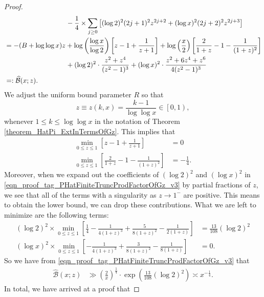 \documentclass[11pt,reqno,a4letter]{article}
\numberwithin{figure}{section}
\numberwithin{table}{section}
\theoremstyle{plain}
\numberwithin{theorem}{section}
\theoremstyle{definition}
\begin{document}
\begin{proof}
\begin{align}
\notag 
     & \phantom{= -(B + \log\log x) z\ } - 
     \frac{1}{4} \times \sum_{j \geq 0} \left[ 
     (\log 2)^2 (2j+1)^2 z^{2j+2} + (\log x)^2 (2j+2)^2 z^{2j+3} 
     \right] \\ 
\notag 
     & = -(B + \log\log x) z + 
     \log\left(\frac{\log x}{\log 2}\right) \left[ 
     z - 1 + \frac{1}{z+1}\right] + 
     \log\left(\frac{x}{2}\right)\left[ 
     \frac{2}{1+z} - 1 - \frac{1}{(1+z)^2}\right] \\ 
\notag 
     & \phantom{= -(B + \log\log x) z\ } + 
     (\log 2)^2 \cdot \frac{z^2+z^4}{(z^2-1)^3} + 
     (\log x)^2 \cdot \frac{z^2+6z^4+z^6}{4 (z^2-1)^3} \\ 
\label{eqn_proof_tag_PHatFiniteTruncProdFactorOfGz_v3} 
     & =: \widehat{\mathcal{B}}(x; z). 
\end{align} 
We adjust the uniform bound parameter $R$ so that 
$$z \equiv z(k, x) = \frac{k-1}{\log\log x} \in \left[0, 1\right),$$ 
whenever $1 \leq k \leq \log\log x$ 
in the notation of Theorem \ref{theorem_HatPi_ExtInTermsOfGz}. 
This implies that 
\begin{align*} 
\min_{0 \leq z \leq 1} \left[z - 1 + \frac{1}{z+1}\right] & = 0 \\ 
\min_{0 \leq z \leq 1} \left[\frac{2}{1+z} - 1 - \frac{1}{(1+z)^2}\right] & = -\frac{1}{4}. 
\end{align*} 
Moreover, when we expand out the coefficients of 
$(\log 2)^2$ and $(\log x)^2$ in 
\eqref{eqn_proof_tag_PHatFiniteTruncProdFactorOfGz_v3} 
by partial fractions of $z$, 
we see that all of the terms with a singularity as $z \rightarrow 1^{-}$ are positive. 
This means to obtain the lower bound, we can drop these contributions. 
What we are left to minimize are the following terms: 
\begin{align*} 
(\log 2)^2 \times \min_{0 \leq z \leq 1} \left[\frac{1}{4} - \frac{1}{4(1+z)^3} + 
     \frac{5}{8(1+z)^2} - \frac{1}{2(1+z)}\right] & = \frac{13}{108} (\log 2)^2 \\ 
(\log x)^2 \times \min_{0 \leq z \leq 1} \left[-\frac{1}{4(1+z)^3} + 
     \frac{3}{8(1+z)^2} - \frac{1}{8(1+z)}\right] & = 0. 
\end{align*} 
So we have from \eqref{eqn_proof_tag_PHatFiniteTruncProdFactorOfGz_v3} that 
\begin{align*} 
\widehat{\mathcal{B}}(x; z) & \gg 
     \left(\frac{2}{x}\right)^{\frac{1}{4}} \cdot \exp\left( 
     \frac{13}{108} (\log 2)^2\right) 
     \asymp x^{-\frac{1}{4}}. 
\end{align*} 
In total, we have arrived at a proof that 

\end{proof}
\end{document}
